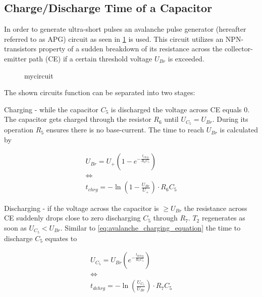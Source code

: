     \subsection{Charge/Discharge Time of a Capacitor}\label{sec:A3_charge-discharge-time}
        In order to generate ultra-short pulses an avalanche pulse generator (hereafter referred to as APG) circuit as seen in \cref{fig:avalanche_pulse_generator_circuit}
        is used. This circuit utilizes an NPN-transistors property of a sudden breakdown of its resistance across the collector-emitter path (CE)
        if a certain threshold voltage \( U_{Br} \) is exceeded.\par
        \begin{figure}[h]
            \centering
            
            \caption{mycircuit}
            \label{fig:avalanche_pulse_generator_circuit}
        \end{figure}
        The shown circuits function can be separated into two stages:\par
        Charging - while the capacitor \( C_5 \) is discharged the voltage across CE equals 0. The capacitor gets charged
        through the resistor \( R_6 \) until \( U_{C_5} = U_{Br}\). During its operation \( R_5 \) ensures there is no
        base-current. The time to reach \( U_{Br} \) is calculated by\par
        \begin{gather}
            U_{Br} = U_+ \left( 1 - e^{-\frac{t_{chrg}}{R_6C_5}}\right) \nonumber \\
            \Leftrightarrow \nonumber \\
            t_{chrg} = - \ln\left(1 - \frac{U_{Br}}{U_+}\right) \cdot R_6 C_5
            \label{eq:avalanche_charging_equation}
        \end{gather}\par
        Discharging - if the voltage across the capacitor is \( \geq U_{Br} \) the resistance across CE suddenly drops close
        to zero discharging \( C_5 \) through \( R_7 \). \( T_2 \) regenerates as soon as \( U_{C_5} < U_{Br} \). Similar to \cref{eq:avalanche_charging_equation}
        the time to discharge \( C_5 \) equates to\par
        \begin{gather}
            U_{C_5} = U_{Br} \left(e^{-\frac{t_{dchrg}}{R_7C_5}}\right) \nonumber \\
            \Leftrightarrow \nonumber \\
            t_{dchrg} = -\ln\left( \frac{U_{C_5}}{U_{Br}} \right) \cdot R_7 C_5
            \label{eq:avalanche_discharging_equation}
        \end{gather}\par
